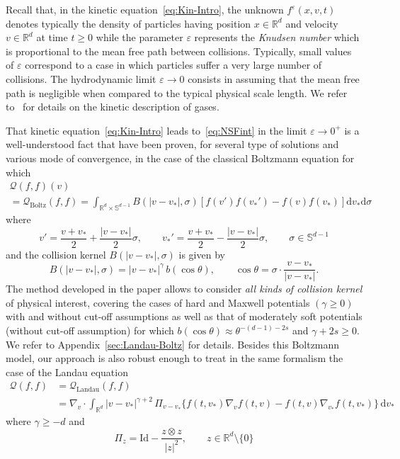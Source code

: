 \documentclass[10pt]{amsart}
\theoremstyle{definition}\newtheorem{defi}[theo]{Definition}\newtheorem{rema}[theo]{Remark}\newtheorem{exam}[theo]{Example}\newtheorem{exem}[theo]{Example}\newtheorem{nota}[theo]{Notation}
\newcommand{\Id}{\mathrm{Id}}
\renewcommand{\d}{\mathrm{d}}
\newcommand{\rLandau}{\mathrm{Landau}}
\newcommand{\rBoltz}{\mathrm{Boltz}}
\newcommand{\R}{\mathbb{R}}
\renewcommand{\S}{\mathbb{S}}
\newcommand{\QQ}{\mathcal{Q}}
\renewcommand*\ge{\geqslant}
\renewcommand*\geq{\geqslant}
\newcommand*\eps{{\varepsilon}}
\begin{document}
Recall that, in the kinetic equation~\eqref{eq:Kin-Intro}, the unknown $f^\eps(x,v,t)$ denotes typically the density of particles having position $x \in \R^{d}$ and velocity $v \in \R^{d}$ at time $t\geq0$ while the parameter $\eps$ represents the \emph{Knudsen number} which is proportional to the mean free path between collisions. Typically, small values of $\eps$ correspond to a case in which particles suffer a very large number of collisions. The hydrodynamic limit $\eps \to 0$ consists in assuming that the mean free path is negligible when compared to the typical physical scale length. We refer to~\cite{Cercignani,Sone} for details on the kinetic description of gases.

That kinetic equation~\eqref{eq:Kin-Intro} leads to~\eqref{eq:NSFint} in the limit $\eps \to 0^{+}$ is a well-understood fact that have been proven, for several type of solutions and various mode of convergence, in the case of the classical Boltzmann equation for which
\begin{multline}\label{eq:QQBoltz}
\QQ(f,f)(v)\\
=\QQ_{\rBoltz}(f,f)=\int_{\R^{d}\times\S^{d-1}}B(|v-v_{*}|,\sigma)\left[f(v')f(v_{*}')-f(v)f(v_{*})\right]\d v_{*}\d\sigma
\end{multline}
where
\[
v'=\frac{v+v_*}{2}+\frac{|v-v_*|}{2}\sigma, \qquad v_{*}'=\frac{v+v_*}{2}-\frac{|v-v_*|}{2}\sigma, \qquad \sigma \in \S^{d-1}
\]
and the collision kernel $B(|v-v_{*}|,\sigma)$ is given by
\[
B(|v-v_{*}|,\sigma)=|v-v_{*}|^{\gamma}\,b(\cos\theta), \qquad \cos \theta=\sigma \cdot \frac{v-v_{*}}{|v-v_{*}|}.
\]
The method developed in the paper allows to consider \emph{all kinds of collision kernel} of physical interest, covering the cases of hard {and Maxwell} potentials $(\gamma \ge 0)$ with and without cut-off assumptions as well as that of moderately soft potentials {(without cut-off assumption) for which $b(\cos \theta) \approx \theta^{-(d-1) - 2 s}$ and $\gamma + 2 s \ge 0$}. We refer to Appendix~\ref{sec:Landau-Boltz} for details. Besides this Boltzmann model, our approach is also robust enough to treat in the same formalism the case of the Landau equation
\begin{align*}
\QQ(f,f)&=\QQ_{\rLandau}(f,f)\\
&=\nabla_{v}\cdot \int_{\R^{d}} |v-v_{*}|^{\gamma+2} \, \Pi_{v-v_{*}}
\Big\{f(t,v_{*}) \nabla_{v} f(t,v) - f(t,v) {\nabla_{v_{*}} f}(t,v_{*}) \Big\}
\, \d v_{*}
\end{align*}
where {$\gamma \geq -d$} and
\[
\Pi_{z}=\Id-\frac{z \otimes z}{|z|^{2}}, \qquad z \in \R^{d} \setminus \{0\}
\]
\end{document}
